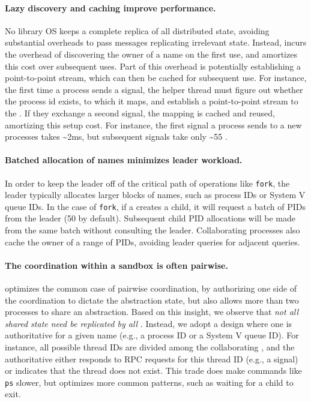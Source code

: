 \paragraph{Lazy discovery and caching improve performance.}  
No library OS keeps a complete replica of all distributed state,
avoiding substantial overheads to pass messages replicating irrelevant state.
Instead, \graphene{} incurs the overhead of discovering the owner of a name
on the first use, and amortizes this cost over subsequent uses.
Part of this overhead is potentially establishing a point-to-point stream,
which can then be cached for subsequent use.
For instance, the first time a process sends a signal, the helper thread 
must figure out whether the process id exists, to which \picoproc{} it maps,
and establish a point-to-point stream to the \picoproc{}.
If they exchange a second signal, the mapping is cached and reused, amortizing this 
setup cost.  For instance, the first signal a process sends to a new processes
takes \~{}2ms, but subsequent signals take only \~{}55 \us{}.

\paragraph{Batched allocation of names minimizes leader workload.}
In order to keep the leader off of the critical path of operations like {\tt fork}, 
the leader typically allocates larger blocks of names, such as process IDs or System V queue IDs.
In the case of {\tt fork}, if a \picoproc{} creates a child, it will request a batch of 
PIDs from the leader (50 by default).  Subsequent child PID allocations will be made from the same 
batch without consulting the leader.
Collaborating processes also cache the owner of a range of PIDs, avoiding 
leader queries for adjacent queries.

\paragraph{The coordination within a sandbox is often pairwise.}
\graphene{} optimizes the common case of pairwise coordination,
by authorizing one side of the coordination to dictate the abstraction state,
but also allows
more than two processes to share an abstraction.
Based on this insight, 
we observe that {\em not all shared state need be replicated by all \picoprocs{}}.
Instead, we adopt a design where one \picoproc{} is authoritative for a given name (e.g., a process ID or a System V queue ID).
For instance, all possible thread IDs are divided among the collaborating \picoprocs{},
and the authoritative \picoproc{} either responds to RPC requests for this thread ID (e.g., a signal)
or indicates that the thread does not exist.
This trade does make commands like {\tt ps} slower, 
but optimizes more common patterns, such as waiting for a child to exit.

